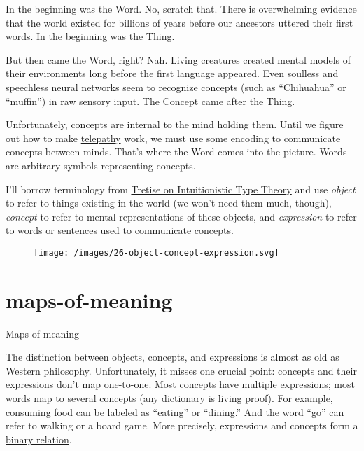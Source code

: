 \documentclass{article}
\begin{document}
In the beginning was the Word.
No, scratch that.
There is overwhelming evidence that the world existed for billions of years before our ancestors uttered their first words.
In the beginning was the Thing.

But then came the Word, right? Nah.
Living creatures created mental models of their environments long before the first language appeared.
Even soulless and speechless neural networks seem to recognize concepts (such as \href{https://github.com/rcgc/chihuahua-muffin}{``Chihuahua'' or ``muffin''}) in raw sensory input.
The Concept came after the Thing.

Unfortunately, concepts are internal to the mind holding them.
Until we figure out how to make \href{https://en.wikipedia.org/wiki/Telepathy}{telepathy} work,
we must use some encoding to communicate concepts between minds.
That's where the Word comes into the picture.
Words are arbitrary symbols representing concepts.

I'll borrow terminology from \href{https://link.springer.com/book/10.1007/978-94-007-1736-7}{Tretise on Intuitionistic Type Theory} and use
\emph{object} to refer to things existing in the world
(we won't need them much, though),
\emph{concept} to refer to mental representations of these objects,
and \emph{expression} to refer to words or sentences used to communicate concepts.

\begin{figure}[grayscale-diagram]
  \texttt{[image: /images/26-object-concept-expression.svg]}
\end{figure}

\section{maps-of-meaning}{Maps of meaning}

The distinction between objects,
concepts, and expressions is almost as old as Western philosophy.
Unfortunately, it misses one crucial point: concepts and their expressions don't map one-to-one.
Most concepts have multiple expressions;
most words map to several concepts (any dictionary is living proof).
For example, consuming food can be labeled as ``eating'' or ``dining.''
And the word ``go'' can refer to walking or a board game.
More precisely, expressions and concepts form a \href{https://en.wikipedia.org/wiki/Binary_relation}{binary relation}.
\end{document}
